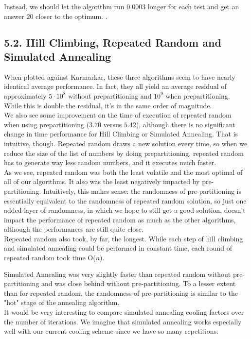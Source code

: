 \documentclass{article}
\begin{document}
Instead, we should let the algorithm run $0.0003$ longer for each test and get an answer $20$ closer to the optimum.
.
\subsection*{5.2. Hill Climbing, Repeated Random and Simulated Annealing}
When plotted against Karmarkar, these three algorithms seem to have nearly identical average performance. In fact, they all yield an average residual of approximately $5\cdot10^8$ without prepartitioning and $10^9$ when prepartitioning. While this is double the residual, it's in the same order of magnitude. \\

We also see some improvement on the time of execution of repeated random when using prepartitioning ($3.70$ versus $5.42$), although there is no significant change in time performance for Hill Climbing or Simulated Annealing. That is intuitive, though. Repeated random draws a new solution every time, so when we reduce the size of the list of numbers by doing prepartitioning, repeated random has to generate way less random numbers, and it executes much faster.\\
 
As we see, repeated random was both the least volatile and the most optimal of all of our algorithms. It also was the least negatively impacted by pre-partitioning. Intuitively, this makes sense: the randomness of pre-partitioning is essentially equivalent to the randomness of repeated random solution, so just one added layer of randomness, in which we hope to still get a good solution, doesn't impact the performance of repeated random as much as the other algorithms, although the performances are still quite close.\\

Repeated random also took, by far, the longest. While each step of hill climbing and simulated annealing could be performed in constant time, each round of repeated random took time O($n$).\

Simulated Annealing was very slightly faster than repeated random without pre-partitioning and was close behind without pre-partitioning. To a lesser extent than for repeated random, the randomness of pre-partitioning is similar to the "hot" stage of the annealing algorithm.\\

It would be very interesting to compare simulated annealing cooling factors over the number of iterations. We imagine that simulated annealing works especially well with our current cooling scheme since we have so many repetitions.\\
\end{document}
